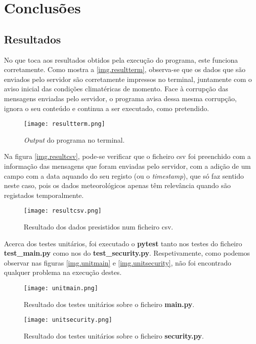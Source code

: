 \documentclass{report}
\begin{document}
\chapter{Conclusões}
\label{chap.conclusao}
\section{Resultados}
No que toca aos resultados obtidos pela execução do programa, este funciona corretamente.\newline
Como mostra a \autoref{img.resultterm}, observa-se que os dados que são enviados pelo servidor são corretamente impressos no terminal, juntamente com o aviso inicial das condições climatéricas de momento. Face à corrupção das mensagens enviadas pelo servidor, o programa avisa dessa mesma corrupção, ignora o seu conteúdo e continua a ser executado, como pretendido.

\begin{figure}[H]
\centering
\texttt{[image: resultterm.png]}
\caption{\textit{Output} do programa no terminal.}
\label{img.resultterm}
\end{figure}

Na figura \autoref{img.resultcsv}, pode-se verificar que o ficheiro \ac{csv} foi preenchido com a informação das mensagens que foram enviadas pelo servidor, com a adição de um campo com a data aquando do seu registo (ou o \textit{timestamp}), que só faz sentido neste caso, pois os dados meteorológicos apenas têm relevância quando são registados temporalmente.

\begin{figure}[H]
\centering
\texttt{[image: resultcsv.png]}
\caption{Resultado dos dados presistidos num ficheiro \ac{csv}.}
\label{img.resultcsv}
\end{figure}

Acerca dos testes unitários, foi executado o \textbf{pytest} tanto nos testes do ficheiro \textbf{test\_main.py} como nos do \textbf{test\_security.py}. Respetivamente, como podemos observar nas figuras \autoref{img.unitmain} e \autoref{img.unitsecurity}, não foi encontrado qualquer problema na execução destes.

\begin{figure}[H]
\centering
\texttt{[image: unitmain.png]}
\caption{Resultado dos testes unitários sobre o ficheiro \textbf{main.py}.}
\label{img.unitmain}
\end{figure}

\begin{figure}[H]
\centering
\texttt{[image: unitsecurity.png]}
\caption{Resultado dos testes unitários sobre o ficheiro \textbf{security.py}.}
\label{img.unitsecurity}
\end{figure}
\end{document}
